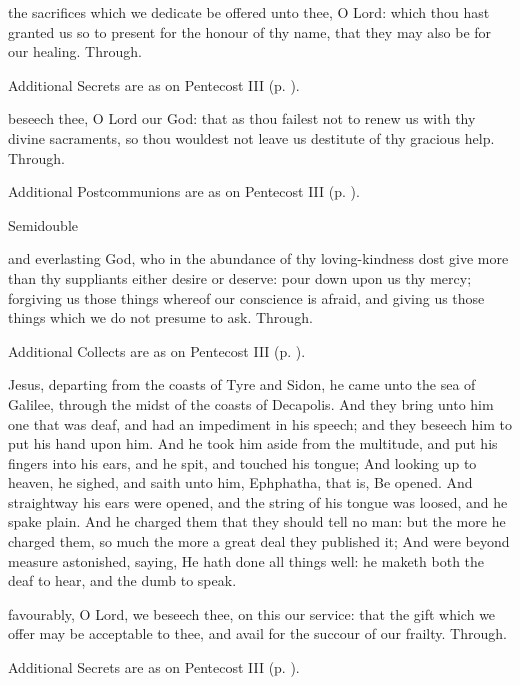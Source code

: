 \secret
{} the sacrifices which we dedicate be offered unto thee, O Lord: which thou hast granted us so to present for the honour of thy name, that they may also be for our healing. Through.
\begin{rubric}
    Additional Secrets are as on Pentecost III (p. \pageref{PentecostIII}).
\end{rubric}

\postcommunion
{} beseech thee, O Lord our God: that as thou failest not to renew us with thy divine sacraments, so thou wouldest not leave us destitute of thy gracious help. Through.
\begin{rubric}
    Additional Postcommunions are as on Pentecost III (p. \pageref{PentecostIII}).
\end{rubric}

\begin{inhead}
{Semidouble}
\end{inhead}

\collect
{} and everlasting God, who in the abundance of thy loving-kindness dost give more than thy suppliants either desire or deserve: pour down upon us thy mercy; forgiving us those things whereof our conscience is afraid, and giving us those things which we do not presume to ask. Through.
\begin{rubric}
    Additional Collects are as on Pentecost III (p. \pageref{PentecostIII}).
\end{rubric}

 Jesus, departing from the coasts of Tyre and Sidon, he came unto the sea of Galilee, through the midst of the coasts of Decapolis. And they bring unto him one that was deaf, and had an impediment in his speech; and they beseech him to put his hand upon him. And he took him aside from the multitude, and put his fingers into his ears, and he spit, and touched his tongue; And looking up to heaven, he sighed, and saith unto him, Ephphatha, that is, Be opened. And straightway his ears were opened, and the string of his tongue was loosed, and he spake plain. And he charged them that they should tell no man: but the more he charged them, so much the more a great deal they published it; And were beyond measure astonished, saying, He hath done all things well: he maketh both the deaf to hear, and the dumb to speak.

\secret
{} favourably, O Lord, we beseech thee, on this our service: that the gift which we offer may be acceptable to thee, and avail for the succour of our frailty. Through.
\begin{rubric}
    Additional Secrets are as on Pentecost III (p. \pageref{PentecostIII}).
\end{rubric}

